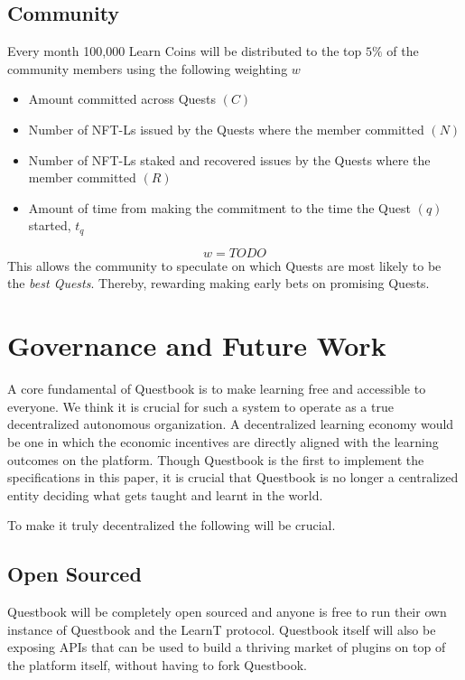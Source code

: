 \documentclass{article}
\begin{document}
      \subsection{Community}
        Every month 100,000 Learn Coins will be distributed to the top \(5\%\) of the community members using the following weighting \(w\) 
        \begin{itemize}
          \item Amount committed across Quests \((C)\)
          \item Number of NFT-Ls issued by the Quests where the member committed \((N)\)
          \item Number of NFT-Ls staked and recovered issues by the Quests where the member committed \((R)\)
          \item Amount of time from making the commitment to the time the Quest \((q)\) started, \(t_q\)
        \end{itemize}
        \[
          w = TODO
        \]
        This allows the community to speculate on which Quests are most likely to be the \textit{best Quests}. Thereby, rewarding making early bets on promising Quests.
  \section{Governance and Future Work}
    A core fundamental of Questbook is to make learning free and accessible to everyone. 
    We think it is crucial for such a system to operate as a true decentralized autonomous organization. 
    A decentralized learning economy would be one in which the economic incentives are directly aligned with the learning outcomes on the platform.
    Though Questbook is the first to implement the specifications in this paper, it is crucial that Questbook is no longer a centralized entity deciding what gets taught and learnt in the world.
    \par
    To make it truly decentralized the following will be crucial.
    \subsection{Open Sourced}
      Questbook will be completely open sourced and anyone is free to run their own instance of Questbook and the LearnT protocol.
      Questbook itself will also be exposing APIs that can be used to build a thriving market of plugins on top of the platform itself, without having to fork Questbook.
\end{document}
